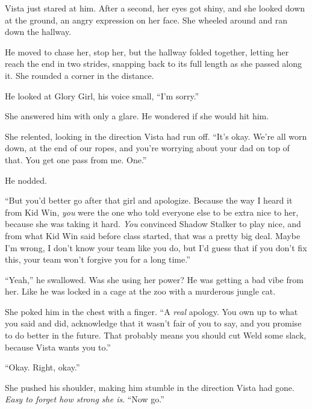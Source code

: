 Vista just stared at him.  After a second, her eyes got shiny, and she looked down at the ground, an angry expression on her face.   She wheeled around and ran down the hallway.



He moved to chase her, stop her, but the hallway folded together, letting her reach the end in two strides, snapping back to its full length as she passed along it.  She rounded a corner in the distance.



He looked at Glory Girl, his voice small, ``I'm sorry.''



She answered him with only a glare.  He wondered if she would hit him.



She relented, looking in the direction Vista had run off.  ``It's okay.  We're all worn down, at the end of our ropes, and you're worrying about your dad on top of that.  You get one pass from me.  One.''



He nodded.



``But you'd better go after that girl and apologize.  Because the way I heard it from Kid Win, \emph{you} were the one who told everyone else to be extra nice to her, because she was taking it hard.  \emph{You} convinced Shadow Stalker to play nice, and from what Kid Win said before class started, that was a pretty big deal.  Maybe I'm wrong, I don't know your team like you do, but I'd guess that if you don't fix this, your team won't forgive you for a long time.''



``Yeah,'' he swallowed.  Was she using her power?  He was getting a bad vibe from her.  Like he was locked in a cage at the zoo with a murderous jungle cat.



She poked him in the chest with a finger.  ``A \emph{real} apology.  You own up to what you said and did, acknowledge that it wasn't fair of you to say, and you promise to do better in the future.  That probably means you should cut Weld some slack, because Vista wants you to.''



``Okay.  Right, okay.''



She pushed his shoulder, making him stumble in the direction Vista had gone.  \emph{Easy to forget how strong she is}.  ``Now go.''



